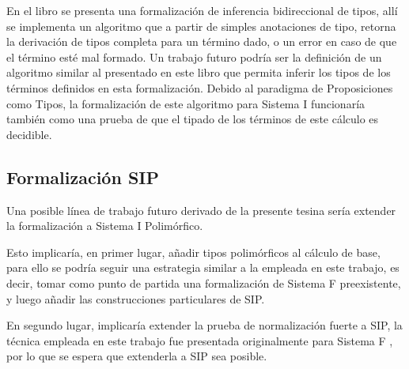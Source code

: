 En el libro  \cite{plfa} se presenta una formalización de inferencia bidireccional de tipos, allí se implementa un algoritmo que a partir de simples anotaciones de tipo, retorna la derivación de tipos completa para un término dado, o un error en caso de que el término esté mal formado.
Un trabajo futuro podría ser la definición de un algoritmo similar al presentado en este libro que permita inferir los tipos de los términos definidos en esta formalización.
Debido al paradigma de Proposiciones como Tipos, la formalización de este algoritmo para Sistema I funcionaría también como una prueba de que el tipado de los términos de este cálculo es decidible.

\subsection{Formalización SIP}

Una posible línea de trabajo futuro derivado de la presente tesina sería extender la formalización a Sistema I Polimórfico.

Esto implicaría, en primer lugar, añadir tipos polimórficos al cálculo de base, para ello se podría seguir una estrategia similar a la empleada en este trabajo, es decir, tomar como punto de partida una formalización de Sistema F preexistente, y luego añadir las construcciones particulares de SIP.

En segundo lugar, implicaría extender la prueba de normalización fuerte a SIP, la técnica empleada en este trabajo fue presentada originalmente para Sistema F \cite{Schafer}, por lo que se espera que extenderla a SIP sea posible.
